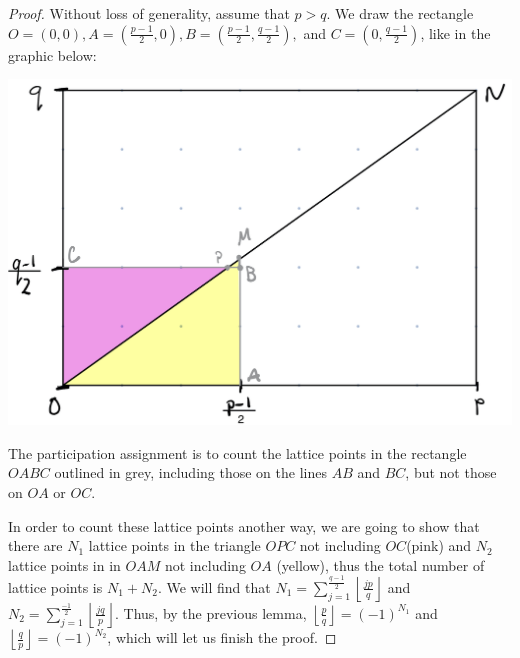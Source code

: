 \documentclass{ximera}
\begin{document}
%
%
\begin{proof}
 Without loss of generality, assume that $p>q$. We draw the rectangle $O=(0,0), A=\left(\frac{p-1}{2},0\right), B=\left(\frac{p-1}{2},\frac{q-1}{2}\right),$ and $C=\left(0,\frac{q-1}{2}\right)$, like in the graphic below:

\begin{image}
 \includegraphics{lattice.jpg}
\end{image}

The participation assignment is to count the lattice points in the rectangle $OABC$ outlined in grey, including those on the lines $AB$ and $BC$, but not those on $OA$ or $OC$. 

In order to count these lattice points another way, we are going to show that there are $N_1$ lattice points in the triangle $OPC$ not including $OC$(pink)  and $N_2$ lattice points in in $OAM$ not including $OA$ (yellow), thus the total number of lattice points is $N_1+N_2$. We will find that $N_1=\sum_{j=1}^{\frac{q-1}{2}}\left\lfloor\frac{jp}{q}\right\rfloor$ and $N_2=\sum_{j=1}^{\frac{-1}{2}}\left\lfloor\frac{jq}{p}\right\rfloor$. Thus, by the previous lemma, $\left\lfloor\frac{p}{q}\right\rfloor=(-1)^{N_1}$ and $\left\lfloor\frac{q}{p}\right\rfloor=(-1)^{N_2}$, which will let us finish the proof. 


\end{proof}
\end{document}
